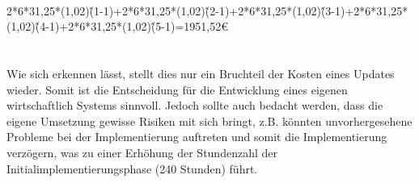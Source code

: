 \\
2*6*31,25*(1,02)\^(1-1)+2*6*31,25*(1,02)\^(2-1)+2*6*31,25*(1,02)\^(3-1)+2*6*31,25*(1,02)\^(4-1)+2*6*31,25*(1,02)\^(5-1)=1951,52€\\
\\
\\
Wie sich erkennen lässt, stellt dies nur ein Bruchteil der Kosten eines Updates wieder.
Somit ist die Entscheidung für die Entwicklung eines eigenen wirtschaftlich Systems sinnvoll.
Jedoch sollte auch bedacht werden, dass die eigene Umsetzung gewisse Risiken mit sich bringt, z.B. könnten unvorhergesehene Probleme bei der Implementierung auftreten und somit die Implementierung verzögern, was zu einer Erhöhung der Stundenzahl der Initialimplementierungsphase (240 Stunden) führt.\\